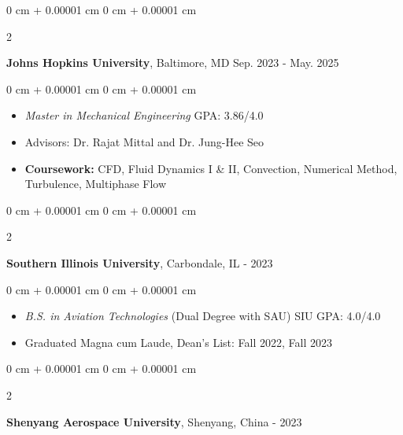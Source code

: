 \documentclass[10pt, letterpaper]{article}
\newenvironment{highlights}{
    \begin{itemize}[
        topsep=0.10 cm,
        parsep=0.10 cm,
        partopsep=0pt,
        itemsep=0pt,
        leftmargin=0 cm + 10pt
    ]
}{
    \end{itemize}
} %
\newenvironment{onecolentry}{
    \begin{adjustwidth}{
        0 cm + 0.00001 cm
    }{
        0 cm + 0.00001 cm
    }
}{
    \end{adjustwidth}
} %
\newenvironment{twocolentry}[2][]{
    \onecolentry
    \def\secondColumn{#2}
    \setcolumnwidth{\fill, 4.5 cm}
    \begin{paracol}{2}
}{ 
    \switchcolumn \raggedleft \secondColumn
    \end{paracol}
    \endonecolentry
} %
\begin{document}
    \vspace{0.2 cm}

    \begin{twocolentry}{
        Sep. 2023 - May. 2025
    }
        \textbf{Johns Hopkins University}, Baltimore, MD\end{twocolentry}

    \vspace{0.10 cm}
    
            \begin{onecolentry}
        \begin{highlights}
            \item \textsl{Master in Mechanical Engineering} \hfill{GPA: 3.86/4.0}
            \item Advisors: Dr. Rajat Mittal and Dr. Jung-Hee Seo

            \item \textbf{Coursework:} CFD, Fluid Dynamics I \& II, Convection, Numerical Method, Turbulence, Multiphase Flow
        
        \end{highlights}
    \end{onecolentry}

    \vspace{0.2 cm}

    \begin{twocolentry}{
        2022 - 2023
    }
        \textbf{Southern Illinois University}, Carbondale, IL\end{twocolentry}

    \vspace{0.10 cm}
    \begin{onecolentry}
        \begin{highlights}

            \item \textsl{B.S. in Aviation Technologies} (Dual Degree with SAU) \hfill{SIU GPA: 4.0/4.0}

            \item Graduated Magna cum Laude, Dean's List: Fall 2022, Fall 2023
         
        \end{highlights}
    \end{onecolentry}

    \vspace{0.2 cm}

    \begin{twocolentry}{
        2019 - 2023
    }
        \textbf{Shenyang Aerospace University}, Shenyang, China\end{twocolentry}
\end{document}
